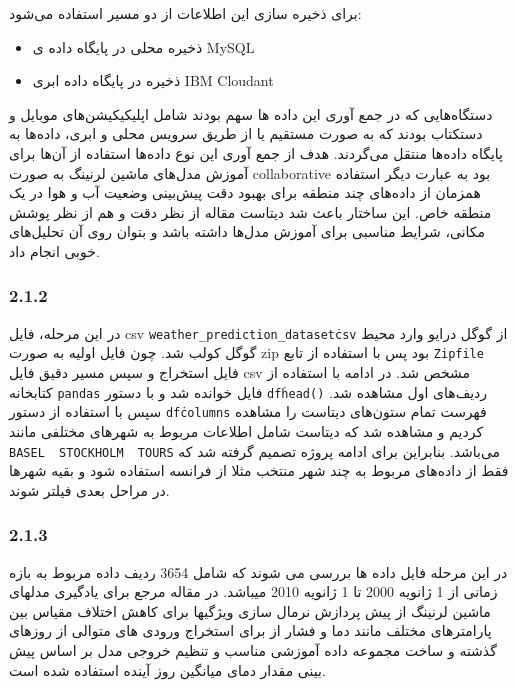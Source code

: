 \documentclass{article}
\begin{document}
برای ذخیره سازی این اطلاعات از دو مسیر استفاده می‌شود:

\begin{itemize}
\item ذخیره محلی در پایگاه داده ی MySQL
\item ذخیره در پایگاه داده ابری IBM Cloudant
\end{itemize}

دستگاه‌هایی که در جمع آوری این داده ها سهم بودند شامل اپلیکیکیشن‌های موبایل و دستکتاب بودند که به صورت مستقیم یا از طریق سرویس محلی و ابری، داده‌ها به پایگاه داده‌ها منتقل می‌گردند. هدف از جمع آوری این نوع داده‌ها استفاده از آن‌ها برای آموزش مدل‌های ماشین لرنینگ به صورت collaborative بود به عبارت دیگر استفاده همزمان از داده‌های چند منطقه برای بهبود دقت پیش‌بینی وضعیت آب و هوا در یک منطقه خاص. این ساختار باعث شد دیتاست مقاله از نظر دقت و هم از نظر پوشش مکانی، شرایط مناسبی برای آموزش مدل‌ها داشته باشد و بتوان روی آن تحلیل‌های خوبی انجام داد.

\subsubsection{2.1.2}


در این مرحله، فایل csv \texttt{weather\_prediction\_dataset\.csv} از گوگل درایو وارد محیط گوگل کولب شد. چون فایل اولیه به صورت zip بود پس با استفاده از تابع \texttt{Zipfile} فایل استخراج و سپس مسیر دقیق فایل csv مشخص شد. در ادامه با استفاده از کتابخانه \texttt{pandas} فایل خوانده شد و با دستور \texttt{df\.head()} ردیف‌های اول مشاهده شد. سپس با استفاده از دستور \texttt{df\.columns} فهرست تمام ستون‌های دیتاست را مشاهده کردیم و مشاهده شد که دیتاست شامل اطلاعات مربوط به شهرهای مختلفی مانند \texttt{BASEL\, STOCKHOLM\, TOURS} می‌باشد. بنابراین برای ادامه پروژه تصمیم گرفته شد که فقط از داده‌های مربوط به چند شهر منتخب مثلا از فرانسه استفاده شود و بقیه شهرها در مراحل بعدی فیلتر شوند.

\subsubsection{2.1.3}

در این مرحله فایل داده ها بررسی می شوند که شامل 3654 ردیف داده مربوط به بازه زمانی از 1 ژانویه 2000 تا 1 ژانویه 2010 میباشد. در مقاله مرجع برای یادگیری مدلهای ماشین لرنینگ از پیش پردازش نرمال سازی ویژگیها برای کاهش اختلاف مقیاس بین پارامترهای مختلف مانند دما و فشار از  برای استخراج ورودی های متوالی از روزهای گذشته و ساخت مجموعه داده آموزشی مناسب و تنظیم خروجی مدل بر اساس پیش بینی مقدار دمای میانگین روز آینده استفاده شده است.
\end{document}
